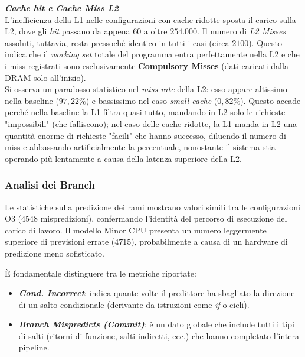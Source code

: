 \documentclass[../../main_document/main.tex]{subfiles}
\begin{document}
\vspace{8pt} 
\noindent
\textbf{\textit{Cache hit e Cache Miss L2}}\\
L'inefficienza della L1 nelle configurazioni con cache ridotte sposta il carico sulla L2, dove gli \textit{hit} passano da appena $60$ a oltre $254.000$. Il numero di \textit{L2 Misses} assoluti, tuttavia, resta pressoché identico in tutti i casi (circa $2100$). Questo indica che il \textit{working set} totale del programma entra perfettamente nella L2 e che i miss registrati sono esclusivamente \textbf{Compulsory Misses} (dati caricati dalla DRAM solo all'inizio).
\\
Si osserva un paradosso statistico nel \textit{miss rate} della L2: esso appare altissimo nella baseline ($97,22\%$) e bassissimo nel caso \textit{small cache} ($0,82\%$). Questo accade perché nella baseline la L1 filtra quasi tutto, mandando in L2 solo le richieste "impossibili" (che falliscono); nel caso delle cache ridotte, la L1 manda in L2 una quantità enorme di richieste "facili" che hanno successo, diluendo il numero di miss e abbassando artificialmente la percentuale, nonostante il sistema stia operando più lentamente a causa della latenza superiore della L2.

\subsubsection{Analisi dei Branch}

Le statistiche sulla predizione dei rami mostrano valori simili tra le configurazioni O3 ($4548$ mispredizioni), confermando l'identità del percorso di esecuzione del carico di lavoro. Il modello Minor CPU presenta un numero leggermente superiore di previsioni errate ($4715$), probabilmente a causa di un hardware di predizione meno sofisticato.

\vspace{8pt} 
\noindent 
È fondamentale distinguere tra le metriche riportate: 
\begin{itemize}[leftmargin=1em]
    \item \textbf{\textit{Cond. Incorrect}}: indica quante volte il predittore ha sbagliato la direzione di un salto condizionale (derivante da istruzioni come \textit{if} o cicli). 
    \item \textbf{\textit{Branch Mispredicts (Commit)}}: è un dato globale che include tutti i tipi di salti (ritorni di funzione, salti indiretti, ecc.) che hanno completato l'intera pipeline. 
\end{itemize}
\end{document}
